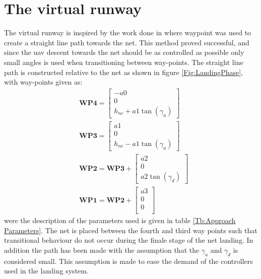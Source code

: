 \section{The virtual runway}\label{SS:netApproach}
The virtual runway is inspired by the work done in \citep{Skulstad&Syversen} where waypoint was used to create a straight line path towards the net. This method proved successful, and since the \gls{uav} descent towards the net should be as controlled as possible only small angles is used when transitioning between way-points. The straight line path is constructed relative to the net as shown in figure \ref{Fig:LandingPhase}, with way-points given as:
\begin{subequations}
\begin{align}
&\mathbf{WP4} = 
\begin{bmatrix}
-a0 \\
0 \\
h_{nc} + a1\tan(\gamma_a) 
\end{bmatrix}\\
&\mathbf{WP3} = 
\begin{bmatrix}
a1 \\
0 \\
h_{nc} - a1\tan(\gamma_a)
\end{bmatrix}\\
&\mathbf{WP2} = \mathbf{WP3} + 
\begin{bmatrix}
a2 \\
0 \\
a2\tan(\gamma_d)
\end{bmatrix}\\
&\mathbf{WP1} = \mathbf{WP2} + 
\begin{bmatrix}
a3 \\
0 \\
0 \\
\end{bmatrix}
\end{align}
\end{subequations}
were the description of the parameters used is given in table \ref{Tb:Approach Parameters}. The net is placed between the fourth and third way points such that transitional behaviour do not occur during the finale stage of the net landing. In addition the path has been made with the assumption that the $\gamma_a$ and $\gamma_d$ is considered small. This assumption is made to ease the demand of the controllers used in the landing system.
